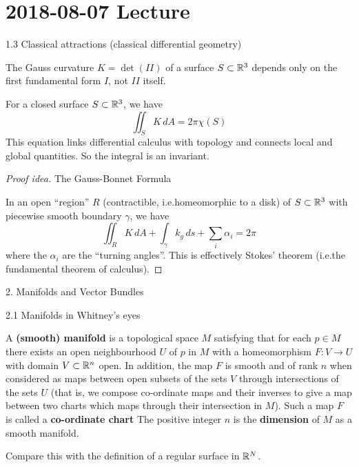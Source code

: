 \section{2018-08-07 Lecture}

1.3 Classical attractions (classical differential geometry)

\begin{thm}
  The Gauss curvature $K=\det(II)$ of a surface $S \subset \mathbb{R}^3$ depends only on the first fundamental form $I$, not $II$ itself.
\end{thm}

\begin{thm}
  For a closed surface $S \subset \mathbb{R}^3$, we have
  \[ \iint_S K \, dA = 2\pi \chi(S) \]
  This equation links differential calculus with topology and connects local and global quantities.
  So the integral is an invariant.
\end{thm}

\begin{proof}[Proof idea]
  The Gauss-Bonnet Formula

  In an open ``region'' $R$ (contractible, i.e.\@ homeomorphic to a disk) of $S \subset \mathbb{R}^3$ with piecewise smooth boundary $\gamma$, we have
  \[ \iint_R K \, dA + \int_\gamma k_g \, ds + \sum_i \alpha_i = 2\pi \]
  where the $\alpha_i$ are the ``turning angles''.
  This is effectively Stokes' theorem (i.e.\@ the fundamental theorem of calculus).
\end{proof}

2. Manifolds and Vector Bundles

2.1 Manifolds in Whitney's eyes

\begin{defn}[2.1]
  A \textbf{(smooth) manifold} is a topological space $M$ satisfying that for each $p \in M$ there exists an open neighbourhood $U$ of $p$ in $M$ with a homeomorphism $F: V \to U$ with domain $V \subset \mathbb{R}^n$ open.
  In addition, the map $F$ is smooth and of rank $n$ when considered as maps between open subsets of the sets $V$ through intersections of the sets $U$ (that is, we compose co-ordinate maps and their inverses to give a map between two charts which maps through their intersection in $M$).
  Such a map $F$ is called a \textbf{co-ordinate chart}
  The positive integer $n$ is the \textbf{dimension} of $M$ as a smooth manifold.
\end{defn}

Compare this with the definition of a regular surface in $\mathbb{R}^N$.

